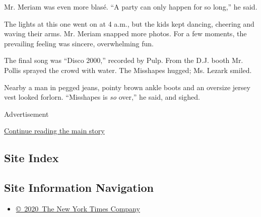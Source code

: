 Mr. Meriam was even more blasé. ``A party can only happen for so long,''
he said.

The lights at this one went on at 4 a.m., but the kids kept dancing,
cheering and waving their arms. Mr. Meriam snapped more photos. For a
few moments, the prevailing feeling was sincere, overwhelming fun.

The final song was ``Disco 2000,'' recorded by Pulp. From the D.J. booth
Mr. Pollis sprayed the crowd with water. The Misshapes hugged; Ms.
Lezark smiled.

Nearby a man in pegged jeans, pointy brown ankle boots and an oversize
jersey vest looked forlorn. ``Misshapes is \emph{so} over,'' he said,
and sighed.

Advertisement

\protect\hyperlink{after-bottom}{Continue reading the main story}

\hypertarget{site-index}{%
\subsection{Site Index}\label{site-index}}

\hypertarget{site-information-navigation}{%
\subsection{Site Information
Navigation}\label{site-information-navigation}}

\begin{itemize}
\tightlist
\item
  \href{https://help.nytimes3xbfgragh.onion/hc/en-us/articles/115014792127-Copyright-notice}{©~2020~The
  New York Times Company}
\end{itemize}

